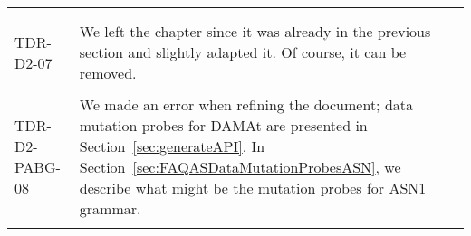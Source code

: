 \begin{longtable}{|p{1.5cm}|p{12cm}|@{}}
\begin{minipage}{12cm}
\end{minipage}\\
\\
\hline

TDR-D2-07&
\begin{minipage}{12cm}
We left the chapter since it was already in the previous section and slightly adapted it. Of course, it can be removed.

\end{minipage}\\
\\
\hline


TDR-D2-PABG-08&
\begin{minipage}{12cm}
We made an error when refining the document; data mutation probes for DAMAt are presented in Section~\ref{sec:generateAPI}. In Section~\ref{sec:FAQASDataMutationProbesASN}, we describe what might be the mutation probes for ASN1 grammar.

\end{minipage}\\
\\
\hline
                                       
\end{longtable}
\normalsize

\clearpage